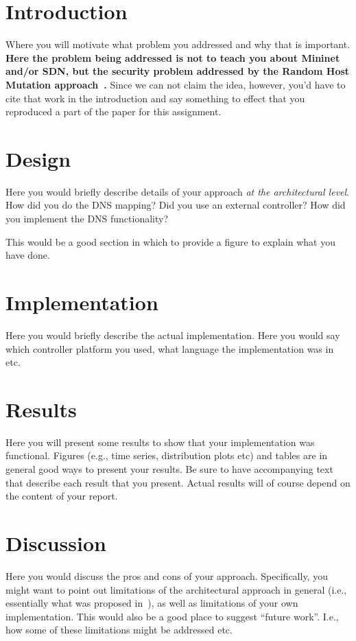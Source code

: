 \section{Introduction}

Where you will motivate what problem you
addressed and why that is important. {\bf Here the problem being
addressed is not to teach you about Mininet and/or SDN, but the
security problem addressed by the Random Host Mutation 
approach~\cite{random.host.mutation}.} Since we can not claim
the idea, however, you'd have to cite that work in the
introduction and say something to effect that you reproduced a part of the
paper for this assignment.

\section{Design}

Here you would briefly describe details of
your approach \emph{at the architectural level}. How did you
do the DNS mapping? Did you use an external controller? How
did you implement the DNS functionality? 

This would be a good section in which to provide a figure
to explain what you have done.

\section{Implementation}

Here you would briefly describe the actual
implementation. Here you would say which controller platform
you used, what language the implementation was in etc.

\section{Results}

Here you will present some results to show that your implementation
was functional. Figures (e.g., time series, distribution plots etc) and
tables are in general good ways to present your results. Be sure to
have accompanying text that describe each result that you present.
Actual results will of course depend on the content of your report.

\section{Discussion}

Here you would discuss the pros and cons of your
approach. Specifically, you might want to point out limitations
of the architectural approach in general (i.e., essentially what was proposed
in~\cite{random.host.mutation}), as well as limitations of your
own implementation. This would also be a good place to suggest
``future work''. I.e., how some of these limitations might be addressed
etc.
